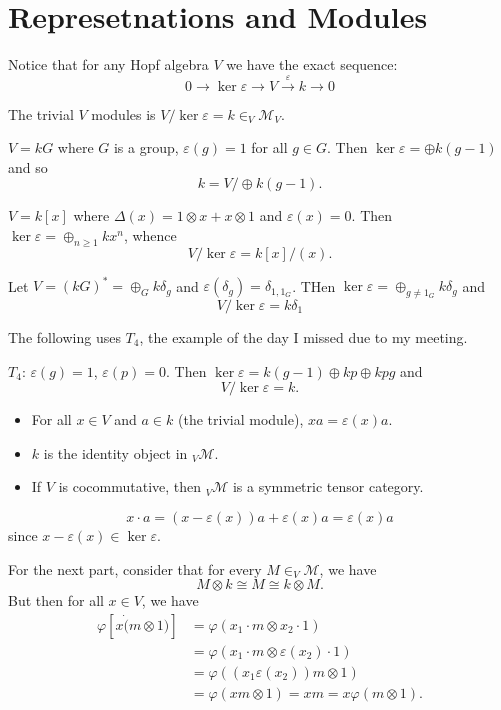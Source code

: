 \documentclass[12pt]{article}
\begin{document}
\section{Represetnations and Modules}
Notice that for any Hopf algebra $V$ we have the exact sequence:
\[0\to \ker\varepsilon\to V\xrightarrow{\varepsilon} k\to 0\]
\begin{defn}
	The trivial $V$ modules is $V/\ker\varepsilon=k\in _V\mathcal{M}_V$.
\end{defn}
\begin{ex}
	$V=kG$ where $G$ is a group, $\varepsilon(g)=1$ for all $g\in G$. Then $\ker\varepsilon=\oplus k(g-1)$ and so
	\[k=V/\oplus k(g-1).\]
\end{ex}
\begin{ex}
	$V=k[x]$ where $\Delta(x)=1\otimes x+x\otimes 1$ and $\varepsilon(x)=0$. Then $\ker\varepsilon=\oplus_{n\ge 1}kx^n$, whence
	\[V/\ker\varepsilon=k[x]/(x).\]
\end{ex}
\begin{ex}
	Let $V=(kG)^*=\oplus_G k\delta_g$ and $\varepsilon(\delta_g)=\delta_{1,1_G}$. THen $\ker\varepsilon=\oplus_{g\ne 1_G}k\delta_g$ and
	\[V/\ker\varepsilon=k\delta_1\]
\end{ex}
The following uses $T_4$, the example of the day I missed due to my meeting.
\begin{ex}
	$T_4$: $\varepsilon(g)=1$, $\varepsilon(p)=0$. Then $\ker\varepsilon=k(g-1)\oplus kp\oplus kpg$ and
	\[V/\ker\varepsilon=k.\]
\end{ex}
\begin{lem}
	\begin{itemize}
		\item For all $x \in V$ and $a\in k$ (the trivial module), $xa=\varepsilon(x)a$.
		\item $k$ is the identity object in $_V\mathcal{M}$.
		\item If $V$ is cocommutative, then $_V\mathcal{M}$ is a symmetric tensor category.
	\end{itemize}
\end{lem}
\begin{prf}
	\[x\cdot a=(x-\varepsilon(x))a+\varepsilon(x)a=\varepsilon(x)a\]
	since $x-\varepsilon(x)\in\ker\varepsilon$.

	For the next part, consider that for every $M\in _V\mathcal{M}$, we have 
	\[M\otimes k\cong M\cong k\otimes M.\]
	But then for all $x\in V$, we have
	\begin{align*}
		\varphi[x\dot(m\otimes 1)]&=\varphi(x_1\cdot m\otimes x_2\cdot 1)\\
		&=\varphi(x_1\cdot m\otimes \varepsilon(x_2)\cdot 1)\\
		&=\varphi((x_1\varepsilon(x_2))m\otimes 1)\\
		&=\varphi(xm\otimes 1)=xm=x\varphi(m\otimes 1).
	\end{align*}
\end{prf}
\end{document}
